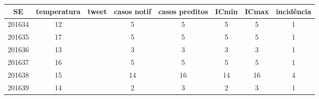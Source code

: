 \begin{tabular}{c|ccccccc}
  \hline
SE & temperatura & tweet & casos notif & casos preditos & ICmin & ICmax & incidência \\ 
  \hline
201634 & 12 &  & 5 & 5 & 5 & 5 & 1 \\ 
  201635 & 17 &  & 5 & 5 & 5 & 5 & 1 \\ 
  201636 & 13 &  & 3 & 3 & 3 & 3 & 1 \\ 
  201637 & 16 &  & 5 & 5 & 5 & 5 & 1 \\ 
  201638 & 15 &  & 14 & 16 & 14 & 16 & 4 \\ 
  201639 & 14 &  & 2 & 3 & 2 & 3 & 1 \\ 
   \hline
\end{tabular}
